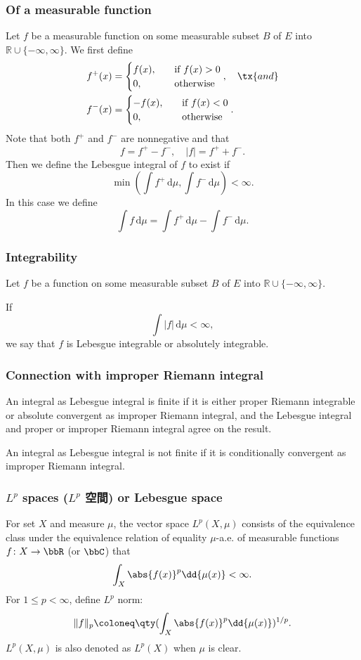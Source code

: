 \documentclass[a4paper,12pt]{report}
\begin{document}
\begin{itemize}
\begin{itemize}
\subsubsection{Of a measurable function}
Let $f$ be a measurable function on some measurable subset $B$ of $E$ into $\mathbb{R}\cup\{-\infty,\infty\}$. We first define
\[\begin{aligned}
f^{+}(x)&=
\begin{cases}
f(x),\quad&\text{if\ }f(x)>0\\
0,\quad &\text{otherwise}
\end{cases},\quad\tx{and}\\
f^{-}(x)&=
\begin{cases}
-f(x),\quad&\text{if\ }f(x)<0\\
0,\quad&\text{otherwise}
\end{cases}.
\end{aligned}\]
Note that both $f^+$ and $f^-$ are nonnegative and that
\[f=f^+-f^-,\quad |f|=f^++f^-.\]
Then we define the Lebesgue integral of $f$ to exist if
\[ \min \left(\int f^{+}\,\mathrm{d}\mu ,\int f^{-}\,\mathrm{d}\mu \right)<\infty.\]
In this case we define
\[ \int f\,\mathrm{d}\mu =\int f^{+}\,\mathrm{d}\mu -\int f^{-}\,\mathrm{d}\mu.\]
\subsubsection{Integrability}
Let $f$ be a function on some measurable subset $B$ of $E$ into $\mathbb{R}\cup\{-\infty,\infty\}$.

If
\[\int |f|\,\mathrm {d} \mu <\infty ,\]
we say that $f$ is Lebesgue integrable or absolutely integrable.
\subsubsection{Connection with improper Riemann integral}
An integral as Lebesgue integral is finite if it is either proper Riemann integrable or absolute convergent as improper Riemann integral, and the Lebesgue integral and proper or improper Riemann integral agree on the result.

An integral as Lebesgue integral is not finite if it is conditionally convergent as improper Riemann integral.
\subsubsection{$L^p$ spaces ($L^p$ 空間) or Lebesgue space}
For set $X$ and measure $\mu$, the vector space $L^p(X,\mu)$ consists of the equivalence class under the equivalence relation of equality $\mu$-a.e. of measurable functions $f\colon X\to\bbR$ (or $\bbC$) that
\[\int_X\abs{f(x)}^p\dd{\mu(x)}<\infty.\]
For $1\leq p<\infty$, define $L^p$ norm:
\[\|f\|_p\coloneq\qty(\int_X\abs{f(x)}^p\dd{\mu(x)})^{1/p}.\]
$L^p(X,\mu)$ is also denoted as $L^p(X)$ when $\mu$ is clear.

\end{itemize}
\end{itemize}
\end{document}
